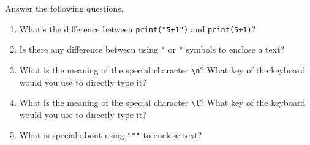 \documentclass[12pt]{book}
\begin{document}
Answer the following questions.

\begin{enumerate}

\item What's the difference between \verb|print("5+1")| and \verb|print(5+1)|?
\item Is there any difference between using \verb|'| or \verb|"| symbols to enclose a text?
\item What is the meaning of the special character \verb|\n|? What key of the keyboard would you use to directly type it?
\item What is the meaning of the special character \verb|\t|? What key of the keyboard would you use to directly type it?
\item What is special about using \verb|"""| to enclose text?


\end{enumerate}
\end{document}
